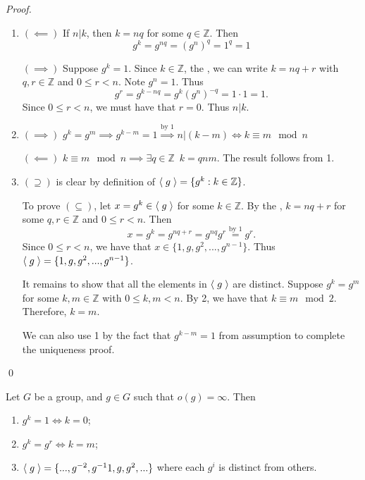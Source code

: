 \begin{proof}
  \begin{enumerate}
    \item $(\impliedby)$ If $n | k$, then $k = nq$ for some $q \in \mathbb{Z}$. Then
      \begin{equation*}
        g^k = g^{nq} = (g^n)^q = 1^q = 1
      \end{equation*}

      $(\implies)$ Suppose $g^k = 1$. Since $k \in \mathbb{Z}$, the , we can write $k = nq + r$ with $q, r \in \mathbb{Z}$ and $0 \leq r < n$. Note $g^n = 1$. Thus
      \begin{equation*}
        g^r = g^{k - nq}  = g^k (g^n)^{-q} = 1 \cdot 1 = 1.
      \end{equation*}
      Since $0 \leq r < n$, we must have that $r = 0$. Thus $n | k$.

    \item $(\implies)$ $g^k = g^m \implies g^{k - m} = 1 \overset{\text{by } 1}{\implies} n | ( k - m ) \iff k \equiv m \mod n$
    
      $(\impliedby)$ $k \equiv m \mod n \implies \exists q \in \mathbb{Z} \enspace k = qnm$. The result follows from 1.

    \item $(\supseteq)$ is clear by definition of $\langle \; g \; \rangle = \{g^k : k \in \mathbb{Z}\}$.

      To prove $(\subseteq)$, let $x = g^k \in \langle \; g \; \rangle$ for some $k \in \mathbb{Z}$. By the , $k = nq + r$ for some $q, r \in \mathbb{Z}$ and $0 \leq r < n$. Then
      \begin{equation*}
        x = g^k = g^{nq + r} = g^{nq} g^r \overset{\text{by } 1}{=} g^r.
      \end{equation*}
      Since $0 \leq r < n$, we have that $x \in \{1, g, g^2, ..., g^{n - 1} \}$. Thus $\langle \; g \; \rangle = \{1, g, g^2, ..., g^{n - 1} \}$.

      It remains to show that all the elements in $\langle \; g \; \rangle$ are distinct. Suppose $g^k = g^m$ for some $k, m \in \mathbb{Z}$ with $0 \leq k, m < n$. By 2, we have that $k \equiv m \mod 2$. Therefore, $k = m$.

      We can also use 1 by the fact that $g^{k - m} = 1$ from assumption to complete the uniqueness proof.
  \end{enumerate} \qed
\end{proof}

\begin{propo}
\label{propo:property_of_elements_of_infinite_order}
  Let $G$ be a group, and $g \in G$ such that $o(g) = \infty$. Then
  \begin{enumerate}
    \item $g^k = 1 \iff k = 0$;
    \item $g^k = g^r \iff k = m$;
    \item $\langle \; g \; \rangle = \{..., g^{-2}, g^{-1} 1, g, g^2, ...\}$ where each $g^i$ is distinct from others.
  \end{enumerate}
\end{propo}

